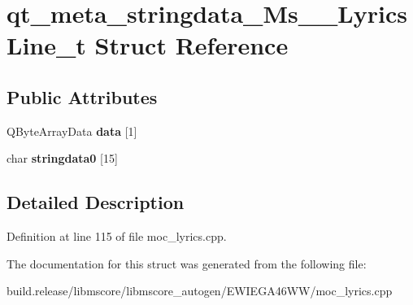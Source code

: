 \hypertarget{structqt__meta__stringdata___ms_____lyrics_line__t}{}\section{qt\+\_\+meta\+\_\+stringdata\+\_\+\+Ms\+\_\+\+\_\+\+Lyrics\+Line\+\_\+t Struct Reference}
\label{structqt__meta__stringdata___ms_____lyrics_line__t}
\subsection*{Public Attributes}
\begin{DoxyCompactItemize}
\item 
\mbox{\label{structqt__meta__stringdata___ms_____lyrics_line__t_a7ac18e04508c0bd83994be0e0b608108}} 
Q\+Byte\+Array\+Data {\bfseries data} \mbox{[}1\mbox{]}
\item 
\mbox{\label{structqt__meta__stringdata___ms_____lyrics_line__t_a00e505cf81e9de68f060766beb868ccc}} 
char {\bfseries stringdata0} \mbox{[}15\mbox{]}
\end{DoxyCompactItemize}


\subsection{Detailed Description}


Definition at line 115 of file moc\+\_\+lyrics.\+cpp.



The documentation for this struct was generated from the following file\+:\begin{DoxyCompactItemize}
\item 
build.\+release/libmscore/libmscore\+\_\+autogen/\+E\+W\+I\+E\+G\+A46\+W\+W/moc\+\_\+lyrics.\+cpp\end{DoxyCompactItemize}
